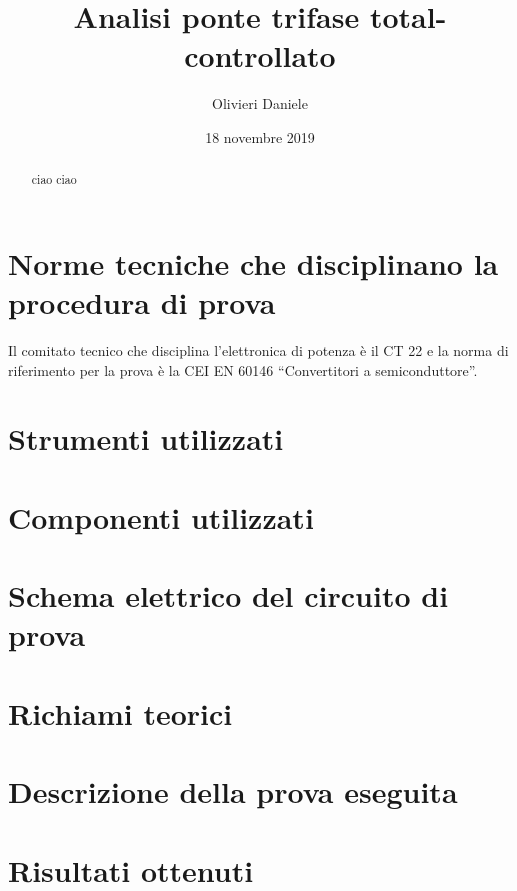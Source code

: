 \documentclass[a4paper,10pt]{article}
\title{Analisi ponte trifase total-controllato}
\author{Olivieri Daniele}
\date{18 novembre 2019}
\begin{document}
\maketitle

\begin{abstract}
 ciao ciao
\end{abstract}

\begin{comment}
\section{Introduzione} %
Elenco canali oscilloscopio:
1 - Giallo: Vl sul carico
2 - Verde: Vr sulla resistenza o corrente nel carico
3 - Blu: corrente al secondario
4 - Rosso: corrente al primarioù

Trasformatore stella con neutro al primario - stella al secondario
\end{comment}


\section{Norme tecniche che disciplinano la procedura di prova}
Il comitato tecnico che disciplina l'elettronica di potenza è il CT 22 e la norma
di riferimento per la prova è la CEI EN 60146 ``Convertitori a semiconduttore''.
\section{Strumenti utilizzati}

\section{Componenti utilizzati}

\section{Schema elettrico del circuito di prova}

\section{Richiami teorici}

\section{Descrizione della prova eseguita}

\section{Risultati ottenuti}
\end{document}
